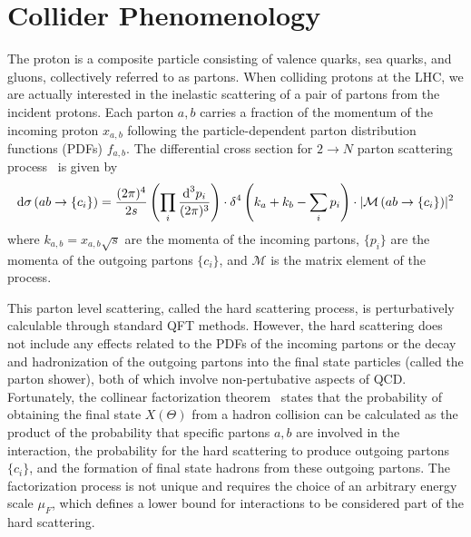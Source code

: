 \section{Collider Phenomenology}
\label{sec:collider_pheno}

The proton is a composite particle consisting of valence quarks, sea quarks, and gluons, collectively referred to as partons.
When colliding protons at the LHC, we are actually interested in the inelastic scattering of a pair of partons from the incident protons.
Each parton $a,b$ carries a fraction of the momentum of the incoming proton $x_{a,b}$ following the particle-dependent parton distribution functions (PDFs) $f_{a,b}$.
The differential cross section for $2\rightarrow N$ parton scattering process~\cite{Perelstein2010} is given by
\begin{equation}
  \text{d}\sigma \left(ab \rightarrow \{c_i\} \right) =
  \frac{(2\pi)^4}{2s} \left( \prod_i \frac{\text{d}^3 p_i}{(2\pi)^3} \right)
  \cdot \delta^4 \left(k_a + k_b - \sum_i p_i \right)
  \cdot \lvert  \mathcal{M} \left(ab \rightarrow \{c_i\} \right) \rvert^2
\end{equation}
where $k_{a,b} = x_{a,b} \sqrt{s}$ are the momenta of the incoming partons, $\{p_i\}$ are the momenta of the outgoing partons $\{c_i\}$, and $\mathcal{M}$ is the matrix element of the process.

This parton level scattering, called the hard scattering process, is perturbatively calculable through standard QFT methods.
However, the hard scattering does not include any effects related to the PDFs of the incoming partons or the decay and hadronization of the outgoing partons into the final state particles (called the parton shower), both of which involve non-pertubative aspects of QCD.
Fortunately, the collinear factorization theorem~\cite{Collins1989} states that the probability of obtaining the final state $X(\Theta)$ from a hadron collision can be calculated as the product of the probability that specific partons $a,b$ are involved in the interaction, the probability for the hard scattering to produce outgoing partons $\{c_i\}$, and the formation of final state hadrons from these outgoing partons.
The factorization process is not unique and requires the choice of an arbitrary energy scale $\mu_F$, which defines a lower bound for interactions to be considered part of the hard scattering.

